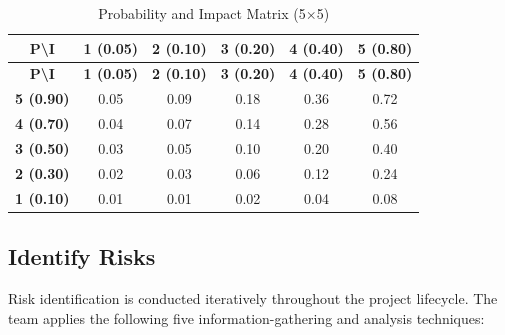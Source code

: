 \documentclass[12pt,a4paper]{article}
\begin{document}
{\footnotesize
\begin{longtable}{@{}c|ccccc@{}}
\caption{Probability and Impact Matrix (5$\times$5)}\label{tab:pi_matrix}\\
\toprule
\textbf{P\textbackslash I} & \textbf{1 (0.05)} & \textbf{2 (0.10)} & \textbf{3 (0.20)} & \textbf{4 (0.40)} & \textbf{5 (0.80)} \\
\midrule
\endfirsthead
\toprule
\textbf{P\textbackslash I} & \textbf{1 (0.05)} & \textbf{2 (0.10)} & \textbf{3 (0.20)} & \textbf{4 (0.40)} & \textbf{5 (0.80)} \\
\midrule
\endhead
\textbf{5 (0.90)} & \cellcolor{green!30}0.05 & \cellcolor{yellow!40}0.09 & \cellcolor{orange!40}0.18 & \cellcolor{red!40}0.36 & \cellcolor{red!60}0.72 \\
\textbf{4 (0.70)} & \cellcolor{green!30}0.04 & \cellcolor{yellow!40}0.07 & \cellcolor{orange!40}0.14 & \cellcolor{red!40}0.28 & \cellcolor{red!60}0.56 \\
\textbf{3 (0.50)} & \cellcolor{green!30}0.03 & \cellcolor{green!30}0.05 & \cellcolor{yellow!40}0.10 & \cellcolor{orange!40}0.20 & \cellcolor{red!40}0.40 \\
\textbf{2 (0.30)} & \cellcolor{green!30}0.02 & \cellcolor{green!30}0.03 & \cellcolor{yellow!40}0.06 & \cellcolor{yellow!40}0.12 & \cellcolor{orange!40}0.24 \\
\textbf{1 (0.10)} & \cellcolor{green!30}0.01 & \cellcolor{green!30}0.01 & \cellcolor{green!30}0.02 & \cellcolor{green!30}0.04 & \cellcolor{yellow!40}0.08 \\
\bottomrule
\end{longtable}
}

\subsection{Identify Risks}

Risk identification is conducted iteratively throughout the project lifecycle. The team applies the following five information-gathering and analysis techniques:
\end{document}
